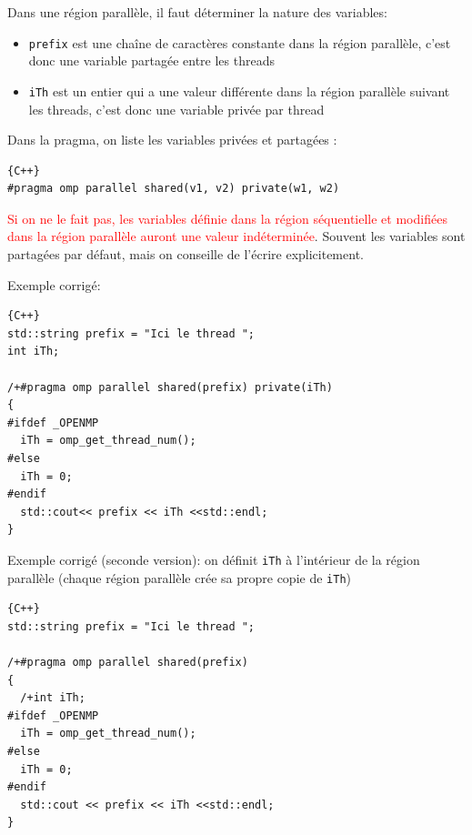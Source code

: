 \documentclass{beamer}
\begin{document}
\begin{frame}[fragile]

	Dans une région parallèle, il faut déterminer la nature des variables:

\begin{itemize}
	\item \verb|prefix| est une chaîne de caractères constante dans la région parallèle, c'est donc une variable partagée entre les threads
	\item \verb|iTh| est un entier qui a une valeur différente dans la région parallèle suivant les threads, c'est donc une variable privée par thread
\end{itemize}

\vfill
Dans la pragma, on liste les variables privées et partagées : 

{\small
\begin{lstlisting}{C++}
#pragma omp parallel shared(v1, v2) private(w1, w2)
\end{lstlisting}
}
\vfill
\textcolor{red}{Si on ne le fait pas, les variables définie dans la région séquentielle et modifiées dans la région parallèle auront une valeur indéterminée}.
\vfill
Souvent les variables sont partagées par défaut, mais on conseille de l'écrire explicitement.
\end{frame}

\begin{frame}[fragile]
	Exemple corrigé:
	
\begin{lstlisting}{C++}
std::string prefix = "Ici le thread ";
int iTh;

/+#pragma omp parallel shared(prefix) private(iTh)
{
#ifdef _OPENMP
  iTh = omp_get_thread_num();
#else
  iTh = 0;
#endif
  std::cout<< prefix << iTh <<std::endl;
}
\end{lstlisting}

\end{frame}

\begin{frame}[fragile]
	Exemple corrigé (seconde version): on définit \verb|iTh| à l'intérieur de la région parallèle (chaque région parallèle crée sa propre copie de \verb|iTh|) 
	
\begin{lstlisting}{C++}
std::string prefix = "Ici le thread ";
	
/+#pragma omp parallel shared(prefix)
{
  /+int iTh;
#ifdef _OPENMP
  iTh = omp_get_thread_num();
#else
  iTh = 0;
#endif
  std::cout << prefix << iTh <<std::endl;
}
	\end{lstlisting}
	
\end{frame}
\end{document}
